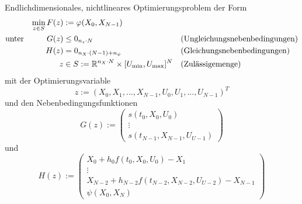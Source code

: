 \begin{problem}\label{prob:EndNichtOpt}
    Endlichdimensionales, nichtlineares Optimierungsproblem der Form
    \begin{align*}
        \min_{z \in S} F(z) &:= \varphi(X_0,X_{N-1}) & & \\
        \text{unter} \hspace{10mm} G(z) &\leq 0_{n_s \cdot N} & &  \text{(Ungleichungsnebenbedingungen)} \\
        H(z) &= 0_{n_X \cdot (N-1) + n_{\psi}} & & \text{(Gleichungsnebenbedingungen)}\\
        z &\in S := \R^{n_X \cdot N} \times [U_{\min},U_{\max}]^{N} & &  \text{(Zulässigemenge)}
    \end{align*}
    mit der Optimierungsvariable
    \begin{equation}
        z := (X_0,X_1,...,X_{N-1},U_0,U_1,...,U_{N-1})^T
    \end{equation}
    und den Nebenbedingungsfunktionen 
    \begin{equation}
        G(z) := 
        \begin{pmatrix}
            s(t_0,X_0,U_0) \\ 
            \vdots \\ 
            s(t_{N-1},X_{N-1},U_{U-1})
        \end{pmatrix} 
    \end{equation}
    und
    \begin{equation}
        H(z) := 
        \begin{pmatrix}
            X_0 + h_0 f(t_0,X_0,U_0) - X_1 \\ 
            \vdots \\ 
            X_{N-2} + h_{N-2} f(t_{N-2},X_{N-2},U_{U-2}) - X_{N-1} \\
            \psi(X_0,X_N)
        \end{pmatrix} 
    \end{equation}
\end{problem}



 








